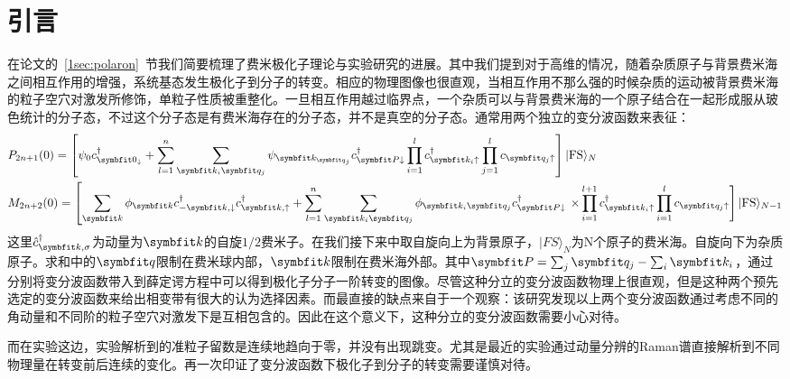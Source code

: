 \section{引言}\label{3sec:intro}
在论文的~\ref{1sec:polaron}~节我们简要梳理了费米极化子理论与实验研究的进展。其中我们提到对于高维的情况，随着杂质原子与背景费米海之间相互作用的增强，系统基态发生极化子到分子的转变。相应的物理图像也很直观，当相互作用不那么强的时候杂质的运动被背景费米海的粒子空穴对激发所修饰，单粒子性质被重整化。一旦相互作用越过临界点，一个杂质可以与背景费米海的一个原子结合在一起形成服从玻色统计的分子态，不过这个分子态是有费米海存在的分子态，并不是真空的分子态。通常用两个独立的变分波函数来表征：
\begin{equation}
\begin{aligned}
&P_{2 n+1}(0) =\left[\psi_{0} c_{\Vector{0}_{\downarrow}}^{\dagger}+\sum_{l=1}^{n} \sum_{\Vector{k}_{i} \Vector{q}_{j}} \psi_{\Vector{k}_{\Vector{q}_{j}}} c_{\Vector{P} \downarrow}^{\dagger} \prod_{i=1}^{l} c_{\Vector{k}_{i} \uparrow}^{\dagger} \prod_{j=1}^{l} c_{\Vector{q}_{j} \uparrow}\right]|\mathrm{FS}\rangle_{N}\\
&M_{2 n+2}(0)= {\left[\sum_{\Vector{k}} \phi_{\Vector{k}} c_{-\Vector{k}, \downarrow}^{\dagger} c_{\Vector{k}, \uparrow}^{\dagger}+\sum_{l=1}^{n} \sum_{\Vector{k}_{i} \Vector{q}_{j}} \phi_{\Vector{k}_{i} \Vector{q}_{j}} c_{\Vector{P} \downarrow}^{\dagger}\right.} \left.\times \prod_{i=1}^{l+1} c_{\Vector{k}_{i} \uparrow}^{\dagger} \prod_{i=1}^{l} c_{\Vector{q}_{j} \uparrow}\right]|\mathrm{FS}\rangle_{N-1}
\end{aligned}
\end{equation}
这里$\hat{c}^\dagger_{\Vector{k},\sigma}$为动量为$\Vector{k}$的自旋$1/2$费米子。在我们接下来中取自旋向上为背景原子，$|FS\rangle_N$为N个原子的费米海。自旋向下为杂质原子。求和中的$\Vector{q}$限制在费米球内部，$\Vector{k}$限制在费米海外部。其中$\Vector{P}=\sum_{j} \Vector{q}_{j}-\sum_{i} \Vector{k}_{i}$，通过分别将变分波函数带入到薛定谔方程中可以得到极化子分子一阶转变的图像。尽管这种分立的变分波函数物理上很直观，但是这种两个预先选定的变分波函数来给出相变带有很大的认为选择因素。而最直接的缺点来自于一个观察\cite{edwards2013smooth}：该研究发现以上两个变分波函数通过考虑不同的角动量和不同阶的粒子空穴对激发下是互相包含的。因此在这个意义下，这种分立的变分波函数需要小心对待。

而在实验这边，实验解析到的准粒子留数是连续地趋向于零，并没有出现跳变。尤其是最近的实验通过动量分辨的Raman谱直接解析到不同物理量在转变前后连续的变化\cite{Sagi2020}。再一次印证了变分波函数下极化子到分子的转变需要谨慎对待。


